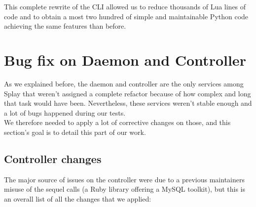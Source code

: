 \documentclass{eplmastersthesis}
\begin{document}
        This complete rewrite of the CLI allowed us to reduce thousands of
        Lua lines of code and to obtain a most two hundred of simple and
        maintainable Python code achieving the same features than before.

    \section{Bug fix on Daemon and Controller}

      As we explained before, the daemon and controller are the only services
      among Splay that weren't assigned a complete refactor because of how
      complex and long that task would have been. Nevertheless, these services
      weren't stable enough and a lot of bugs happened during our tests.\\
      We therefore needed to apply a lot of corrective changes on those, and
      this section's goal is to detail this part of our work.

      \subsection{Controller changes}

        The major source of issues on the controller were due to a previous
        maintainers misuse of the sequel calls (a Ruby library offering a MySQL
        toolkit), but this is an overall list of all the changes that we
        applied:
\end{document}
